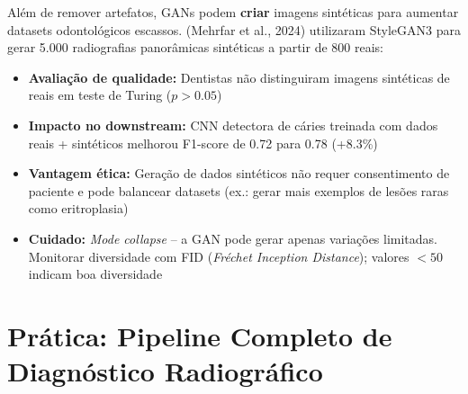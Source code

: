 Além de remover artefatos, GANs podem \textbf{criar} imagens sintéticas para
aumentar datasets odontológicos escassos.  (Mehrfar et
al., 2024) utilizaram StyleGAN3 para gerar 5.000 radiografias panorâmicas
sintéticas a partir de 800 reais:

\begin{itemize}
  \item \textbf{Avaliação de qualidade:} Dentistas não distinguiram imagens
        sintéticas de reais em teste de Turing ($p > 0.05$)
  \item \textbf{Impacto no downstream:} CNN detectora de cáries treinada com
        dados reais + sintéticos melhorou F1-score de 0.72 para 0.78 (+8.3\%)
  \item \textbf{Vantagem ética:} Geração de dados sintéticos não requer
        consentimento de paciente e pode balancear datasets (ex.: gerar mais
        exemplos de lesões raras como eritroplasia)
  \item \textbf{Cuidado:} \textit{Mode collapse} -- a GAN pode gerar apenas
        variações limitadas. Monitorar diversidade com FID (\textit{Fréchet
        Inception Distance}); valores $< 50$ indicam boa diversidade
\end{itemize}


\section{Prática: Pipeline Completo de Diagnóstico Radiográfico}
\label{sec:pratica-radiologia}

\niveltres

